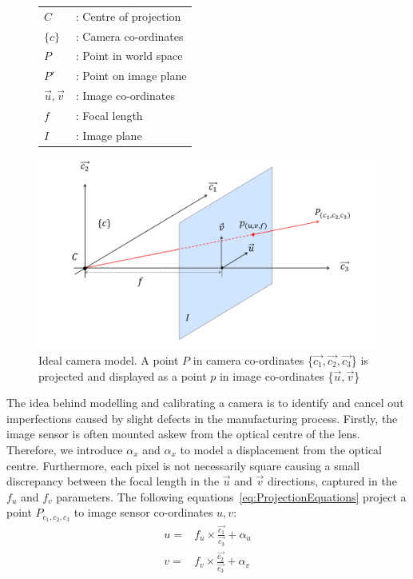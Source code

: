 \documentclass{UoNMCHA}
\numberwithin{equation}{section}
\begin{document}
\begin{figure}[ht]
	\begin{minipage}[c]{0.3\linewidth}
		\centering
		\begin{tabular}{l l}
			$C$ &: Centre of projection\\
			$\{c\}$ &: Camera co-ordinates\\
			$P$ &: Point in world space\\
			$P'$ &: Point on image plane\\
			$\vec{u}, \vec{v}$ &: Image co-ordinates\\
			$f$ &: Focal length\\
			$I$ &: Image plane
		\end{tabular}
	\end{minipage}
	\begin{minipage}[c]{0.65\linewidth}
		\includegraphics[width=1\linewidth]{Figures/Planar_Model}	
	\end{minipage}
\caption{Ideal camera model. A point $P$ in camera co-ordinates \{$\vec{c_{1}}, \vec{c_{2}}, \vec{c_{3}}$\} is projected and displayed as a point $p$ in image co-ordinates \{$\vec{u}, \vec{v}$\}}
\label{fig:PlainarModel}
\end{figure}
The idea behind modelling and calibrating a camera is to identify and cancel out imperfections caused by slight defects in the manufacturing process. Firstly, the image sensor is often mounted askew from the optical centre of the lens. Therefore, we introduce $\alpha_{x}$ and $\alpha_{x}$ to model a displacement from the optical centre. Furthermore, each pixel is not necessarily square causing a small discrepancy between the focal length in the $\vec{u}$ and $\vec{v}$ directions, captured in the $f_{u}$ and $f_{v}$ parameters. The following equations~\ref{eq:ProjectionEquations} project a point $P_{c_{1}, c_{2}, c_{3}}$ to image sensor co-ordinates $u, v$:
\begin{equation*}\label{eq:ProjectionEquations}
	\begin{split}
		u = &f_{u} \times \frac{\vec{c_{1}}}{\vec{c_{3}}} + \alpha_{u}\\
		v = &f_{v} \times \frac{\vec{c_{2}}}{\vec{c_{3}}} + \alpha_{v}
	\end{split}
\end{equation*}
\end{document}

